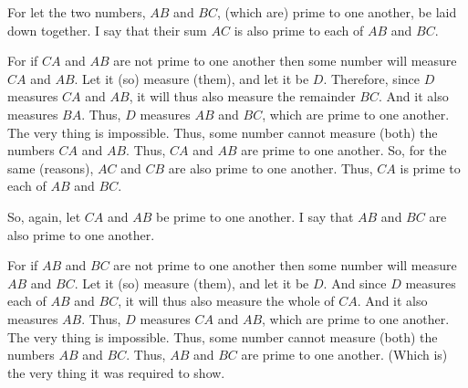 \begin{Parallel}{}{}
{\epsfysize=0.7in
\centerline{}

For let the two numbers, $AB$ and $BC$, (which are) prime to one another,
be laid down together. I say that their sum $AC$ is also prime to each of
$AB$ and $BC$.

For if $CA$ and $AB$ are not prime to one another then some number
will measure $CA$ and $AB$. Let it (so) measure (them), and let it be $D$.
Therefore, since $D$ measures $CA$ and $AB$, it will thus also measure the remainder
$BC$. And it also measures $BA$. Thus, $D$ measures $AB$ and $BC$, which are
prime to one another. The very thing is impossible. Thus, some number cannot measure (both) the numbers $CA$ and $AB$. Thus, $CA$ and $AB$ are prime to
one another. So, for the same (reasons), $AC$ and $CB$ are also prime to one another. Thus, $CA$ is prime to each of $AB$ and $BC$.

So, again, let $CA$ and $AB$  be prime to one another. I say that $AB$ and $BC$
are also prime to one another.

For if $AB$ and $BC$ are not prime to one another then some number will measure $AB$ and $BC$. Let it (so) measure (them), and let it be $D$. And since
$D$ measures each of $AB$ and $BC$, it will thus also measure the whole
of $CA$. And it also measures $AB$. Thus, $D$ measures $CA$ and $AB$, which are
prime to one another. The very thing is impossible. Thus, some number
cannot measure (both) the numbers $AB$ and $BC$. Thus, $AB$ and $BC$ are prime
to one another. (Which is) the very thing it was required to show.}
\end{Parallel}

